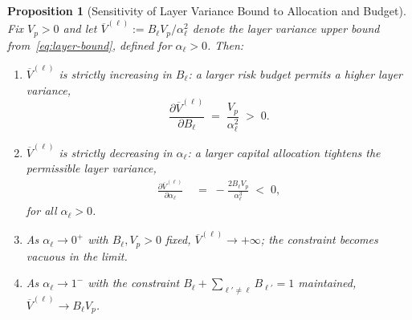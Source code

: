 \documentclass[12pt,openany]{book}
\numberwithin{equation}{chapter}
\theoremstyle{plain}
\newtheorem{proposition}[theorem]{Proposition}
\theoremstyle{definition}
\theoremstyle{remark}
\begin{document}
\begin{proposition}[Sensitivity of Layer Variance Bound to
                    Allocation and Budget]
\label{prop:sensitivity}
Fix $V_p > 0$ and let $\overline{V}^{(\ell)} :=
B_\ell V_p / \alpha_\ell^2$ denote the layer variance upper
bound from~\eqref{eq:layer-bound}, defined for $\alpha_\ell > 0$.
Then:
\begin{enumerate}
  \item $\overline{V}^{(\ell)}$ is \emph{strictly increasing}
        in $B_\ell$: a larger risk budget permits a higher
        layer variance,
        \begin{equation}
          \frac{\partial \overline{V}^{(\ell)}}{\partial B_\ell}
          \;=\; \frac{V_p}{\alpha_\ell^2}
          \;>\; 0.
          \label{eq:sens-B}
        \end{equation}
  \item $\overline{V}^{(\ell)}$ is \emph{strictly decreasing}
        in $\alpha_\ell$: a larger capital allocation tightens
        the permissible layer variance,
        \begin{align}
          \frac{\partial \overline{V}^{(\ell)}}{\partial \alpha_\ell}
          &\;=\; -\frac{2 B_\ell V_p}{\alpha_\ell^3}
          \;<\; 0,
          \label{eq:sens-alpha}
        \end{align}
        for all $\alpha_\ell > 0$.
  \item As $\alpha_\ell \to 0^+$ with $B_\ell, V_p > 0$ fixed,
        $\overline{V}^{(\ell)} \to +\infty$;
        the constraint becomes vacuous in the limit.
  \item As $\alpha_\ell \to 1^-$ with the constraint
        $B_\ell + \sum_{\ell' \neq \ell} B_{\ell'} = 1$
        maintained, $\overline{V}^{(\ell)} \to B_\ell V_p$.
\end{enumerate}
\end{proposition}
\end{document}
